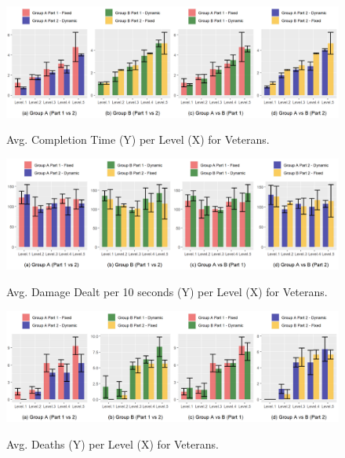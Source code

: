 \begin{figure}[!ht]
    \begin{center}
    \caption{Avg. Completion Time (Y) per Level (X) for Veterans.}
        \includegraphics[width=34em]{figures/completion_time-veteran_players.png}
        \label{fig:result-metric-veterans-completion-time}
    \end{center}
\end{figure}

\begin{figure}[!ht]
    \begin{center}
    \caption{Avg. Damage Dealt per 10 seconds (Y) per Level (X) for Veterans.}
        \includegraphics[width=34em]{figures/damage_dealt_per_10s-veteran_players.png}
        \label{fig:result-metric-veterans-damage-dealt-per-10s}
    \end{center}
\end{figure}

\begin{figure}[!ht]
    \begin{center}
    \caption{Avg. Deaths (Y) per Level (X) for Veterans.}
        \includegraphics[width=34em]{figures/deaths_per_level-veteran_players.png}
        \label{fig:result-metric-veterans-deaths-per-level}
    \end{center}
\end{figure}

